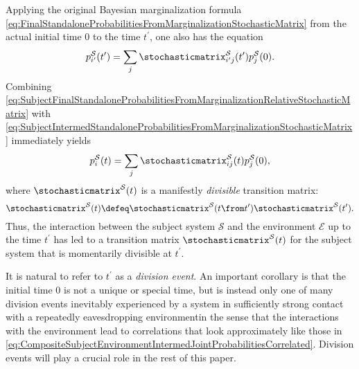 \documentclass[12pt,english,prl,superscriptaddress,nobibnotes,nofootinbib]{revtex4-2}
\let\originalleft\left
\let\originalright\right
\renewcommand{\left}{\mathopen{}\mathclose\bgroup\originalleft}
\renewcommand{\right}{\aftergroup\egroup\originalright}
\begin{document}
Applying the original Bayesian marginalization formula \eqref{eq:FinalStandaloneProbabilitiesFromMarginalizationStochasticMatrix}
from the actual initial time $0$ to the time $t^{\prime}$, one also
has the equation 
\begin{equation}
p_{i^{\prime}}^{\mathcal{S}}\left(t^{\prime}\right)=\sum_{j}\stochasticmatrix_{i^{\prime}j}^{\mathcal{S}}\left(t^{\prime}\right)p_{j}^{\mathcal{S}}\left(0\right).\label{eq:SubjectIntermedStandaloneProbabilitiesFromMarginalizationStochasticMatrix}
\end{equation}
 Combining \eqref{eq:SubjectFinalStandaloneProbabilitiesFromMarginalizationRelativeStochasticMatrix}
with \eqref{eq:SubjectIntermedStandaloneProbabilitiesFromMarginalizationStochasticMatrix}
immediately yields 
\begin{equation}
p_{i}^{\mathcal{S}}\left(t\right)=\sum_{j}\stochasticmatrix_{ij}^{\mathcal{S}}\left(t\right)p_{j}^{\mathcal{S}}\left(0\right),\label{eq:SubjectFinalStandaloneProbabilitiesFromMarginalizationStochasticMatrix}
\end{equation}
 where $\stochasticmatrix^{\mathcal{S}}\left(t\right)$ is a manifestly
\emph{divisible} transition matrix: 
\begin{equation}
\stochasticmatrix^{\mathcal{S}}\left(t\right)\defeq\stochasticmatrix^{\mathcal{S}}\left(t\from t^{\prime}\right)\stochasticmatrix^{\mathcal{S}}\left(t^{\prime}\right).\label{eq:SubjectDivisibleStochasticMatrixDivisionEvent}
\end{equation}
 Thus, the interaction between the subject system $\mathcal{S}$ and
the environment $\mathcal{E}$ up to the time $t^{\prime}$ has led
to a transition matrix $\stochasticmatrix^{\mathcal{S}}\left(t\right)$
for the subject system that is momentarily divisible at $t^{\prime}$.

It is natural to refer to $t^{\prime}$ as a \emph{division event}.
An important corollary is that the initial time $0$ is not a unique
or special time, but is instead only one of many division events inevitably
experienced by a system in sufficiently strong contact with a repeatedly
eavesdropping environment\textemdash in the sense that the interactions
with the environment lead to correlations that look approximately
like those in \eqref{eq:CompositeSubjectEnvironmentIntermedJointProbabilitiesCorrelated}.
Division events will play a crucial role in the rest of this paper.
\end{document}
